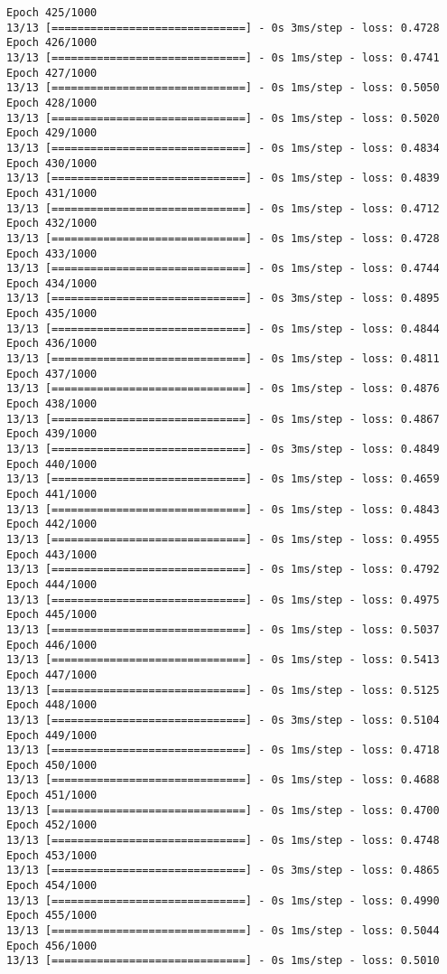 \documentclass[11pt]{article}
\begin{document}
\begin{Verbatim}[commandchars=\\\{\}]
Epoch 425/1000
13/13 [==============================] - 0s 3ms/step - loss: 0.4728
Epoch 426/1000
13/13 [==============================] - 0s 1ms/step - loss: 0.4741
Epoch 427/1000
13/13 [==============================] - 0s 1ms/step - loss: 0.5050
Epoch 428/1000
13/13 [==============================] - 0s 1ms/step - loss: 0.5020
Epoch 429/1000
13/13 [==============================] - 0s 1ms/step - loss: 0.4834
Epoch 430/1000
13/13 [==============================] - 0s 1ms/step - loss: 0.4839
Epoch 431/1000
13/13 [==============================] - 0s 1ms/step - loss: 0.4712
Epoch 432/1000
13/13 [==============================] - 0s 1ms/step - loss: 0.4728
Epoch 433/1000
13/13 [==============================] - 0s 1ms/step - loss: 0.4744
Epoch 434/1000
13/13 [==============================] - 0s 3ms/step - loss: 0.4895
Epoch 435/1000
13/13 [==============================] - 0s 1ms/step - loss: 0.4844
Epoch 436/1000
13/13 [==============================] - 0s 1ms/step - loss: 0.4811
Epoch 437/1000
13/13 [==============================] - 0s 1ms/step - loss: 0.4876
Epoch 438/1000
13/13 [==============================] - 0s 1ms/step - loss: 0.4867
Epoch 439/1000
13/13 [==============================] - 0s 3ms/step - loss: 0.4849
Epoch 440/1000
13/13 [==============================] - 0s 1ms/step - loss: 0.4659
Epoch 441/1000
13/13 [==============================] - 0s 1ms/step - loss: 0.4843
Epoch 442/1000
13/13 [==============================] - 0s 1ms/step - loss: 0.4955
Epoch 443/1000
13/13 [==============================] - 0s 1ms/step - loss: 0.4792
Epoch 444/1000
13/13 [==============================] - 0s 1ms/step - loss: 0.4975
Epoch 445/1000
13/13 [==============================] - 0s 1ms/step - loss: 0.5037
Epoch 446/1000
13/13 [==============================] - 0s 1ms/step - loss: 0.5413
Epoch 447/1000
13/13 [==============================] - 0s 1ms/step - loss: 0.5125
Epoch 448/1000
13/13 [==============================] - 0s 3ms/step - loss: 0.5104
Epoch 449/1000
13/13 [==============================] - 0s 1ms/step - loss: 0.4718
Epoch 450/1000
13/13 [==============================] - 0s 1ms/step - loss: 0.4688
Epoch 451/1000
13/13 [==============================] - 0s 1ms/step - loss: 0.4700
Epoch 452/1000
13/13 [==============================] - 0s 1ms/step - loss: 0.4748
Epoch 453/1000
13/13 [==============================] - 0s 3ms/step - loss: 0.4865
Epoch 454/1000
13/13 [==============================] - 0s 1ms/step - loss: 0.4990
Epoch 455/1000
13/13 [==============================] - 0s 1ms/step - loss: 0.5044
Epoch 456/1000
13/13 [==============================] - 0s 1ms/step - loss: 0.5010

\end{Verbatim}
\end{document}

